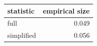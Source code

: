 \begin{tabular}{lr}
\toprule
statistic & empirical size \\
\midrule
full & 0.049 \\
simplified & 0.056 \\
\bottomrule
\end{tabular}
